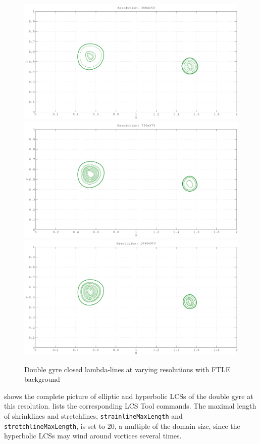 \documentclass{elsarticle}
\begin{document}
\begin{figure}[hbt]
\centering
\includegraphics[width=.8\textwidth]{graphics/double_gyre/lambda_lcs_convergence_500}
\includegraphics[width=.8\textwidth]{graphics/double_gyre/lambda_lcs_convergence_750}
\includegraphics[width=.8\textwidth]{graphics/double_gyre/lambda_lcs_convergence_1000}
\caption{Double gyre closed lambda-lines at varying resolutions with FTLE background}
\label{fig:double_gyre_lambda_lcs_convergence}
\end{figure}

 shows the complete picture of elliptic and hyperbolic LCSs of the double gyre at this resolution.  lists the corresponding LCS Tool commands. The maximal length of shrinklines and stretchlines, \lstinline!strainlineMaxLength! and \lstinline!stretchlineMaxLength!, is set to $20$, a multiple of the domain size, since the hyperbolic LCSs may wind around vortices several times. 
\end{document}
